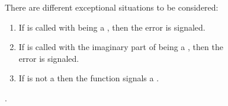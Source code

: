 \documentclass[../Exponentials-Logarithms-Trigonometry.tex]{subfiles}
\begin{document}
\DExceptional{}

There are different exceptional situations to be considered:
\begin{enumerate}
\item If  is called with
   being a , then the
   error is signaled.
\item If  is called with the imaginary
  part of  being a , then the\\
   error is signaled.
\item If  is not a \CL{}
   then the function  signals a
  .
\end{enumerate}

\DSeeAlso{}

.
\end{document}
